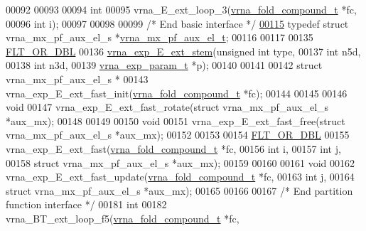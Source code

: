 \begin{DoxyCode}
00092 
00093 
00094 \textcolor{keywordtype}{int}
00095 vrna\_E\_ext\_loop\_3(\hyperlink{group__fold__compound_structvrna__fc__s}{vrna\_fold\_compound\_t}  *fc,
00096                   \textcolor{keywordtype}{int}                   i);
00097 
00098 
00099 \textcolor{comment}{/* End basic interface */}
\hyperlink{group__eval__loops__ext_gaf9d5160c11ffad3ec258124a77fee13c}{00115} \textcolor{keyword}{typedef} \textcolor{keyword}{struct }vrna\_mx\_pf\_aux\_el\_s *\hyperlink{group__eval__loops__ext_gaf9d5160c11ffad3ec258124a77fee13c}{vrna\_mx\_pf\_aux\_el\_t};
00116 
00117 
00135 \hyperlink{group__data__structures_ga31125aeace516926bf7f251f759b6126}{FLT\_OR\_DBL}
00136 \hyperlink{group__eval__loops__ext_ga357484958d3cd677f88f16c75c8a5730}{vrna\_exp\_E\_ext\_stem}(\textcolor{keywordtype}{unsigned} \textcolor{keywordtype}{int}      type,
00137                     \textcolor{keywordtype}{int}               n5d,
00138                     \textcolor{keywordtype}{int}               n3d,
00139                     \hyperlink{group__energy__parameters_structvrna__exp__param__s}{vrna\_exp\_param\_t}  *p);
00140 
00141 
00142 \textcolor{keyword}{struct }vrna\_mx\_pf\_aux\_el\_s *
00143 vrna\_exp\_E\_ext\_fast\_init(\hyperlink{group__fold__compound_structvrna__fc__s}{vrna\_fold\_compound\_t} *fc);
00144 
00145 
00146 \textcolor{keywordtype}{void}
00147 vrna\_exp\_E\_ext\_fast\_rotate(\textcolor{keyword}{struct} vrna\_mx\_pf\_aux\_el\_s *aux\_mx);
00148 
00149 
00150 \textcolor{keywordtype}{void}
00151 vrna\_exp\_E\_ext\_fast\_free(\textcolor{keyword}{struct} vrna\_mx\_pf\_aux\_el\_s *aux\_mx);
00152 
00153 
00154 \hyperlink{group__data__structures_ga31125aeace516926bf7f251f759b6126}{FLT\_OR\_DBL}
00155 vrna\_exp\_E\_ext\_fast(\hyperlink{group__fold__compound_structvrna__fc__s}{vrna\_fold\_compound\_t}        *fc,
00156                     \textcolor{keywordtype}{int}                         i,
00157                     \textcolor{keywordtype}{int}                         j,
00158                     \textcolor{keyword}{struct} vrna\_mx\_pf\_aux\_el\_s  *aux\_mx);
00159 
00160 
00161 \textcolor{keywordtype}{void}
00162 vrna\_exp\_E\_ext\_fast\_update(\hyperlink{group__fold__compound_structvrna__fc__s}{vrna\_fold\_compound\_t}       *fc,
00163                            \textcolor{keywordtype}{int}                        j,
00164                            \textcolor{keyword}{struct} vrna\_mx\_pf\_aux\_el\_s *aux\_mx);
00165 
00166 
00167 \textcolor{comment}{/* End partition function interface */}
00181 \textcolor{keywordtype}{int}
00182 vrna\_BT\_ext\_loop\_f5(\hyperlink{group__fold__compound_structvrna__fc__s}{vrna\_fold\_compound\_t}  *fc,

\end{DoxyCode}
